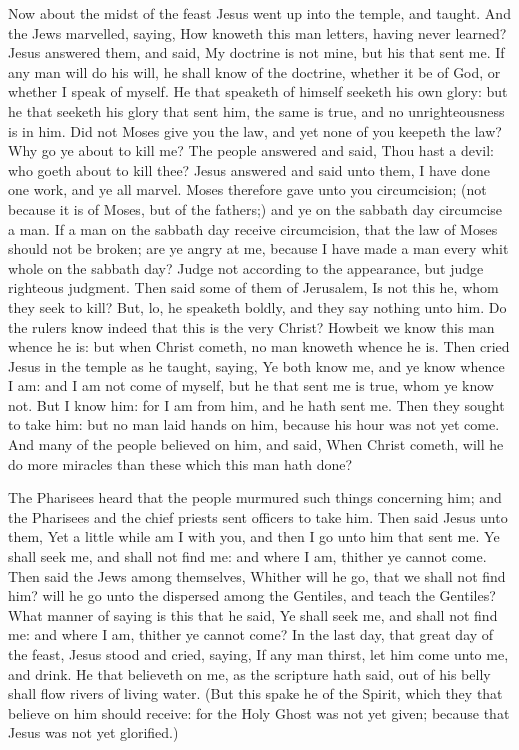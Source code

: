  Now about the midst of the feast Jesus went up into the
temple, and taught.  And the Jews marvelled, saying, How
knoweth this man letters, having never learned?  Jesus
answered them, and said, My doctrine is not mine, but his that sent me.
 If any man will do his will, he shall know of the
doctrine, whether it be of God, or whether I speak of myself.
 He that speaketh of himself seeketh his own glory: but
he that seeketh his glory that sent him, the same is true, and no
unrighteousness is in him.  Did not Moses give you the
law, and yet none of you keepeth the law? Why go ye about to kill me?
 The people answered and said, Thou hast a devil: who
goeth about to kill thee?  Jesus answered and said unto
them, I have done one work, and ye all marvel.  Moses
therefore gave unto you circumcision; (not because it is of Moses, but
of the fathers;) and ye on the sabbath day circumcise a man.
 If a man on the sabbath day receive circumcision, that
the law of Moses should not be broken; are ye angry at me, because I
have made a man every whit whole on the sabbath day? 
Judge not according to the appearance, but judge righteous judgment.
 Then said some of them of Jerusalem, Is not this he,
whom they seek to kill?  But, lo, he speaketh boldly, and
they say nothing unto him. Do the rulers know indeed that this is the
very Christ?  Howbeit we know this man whence he is: but
when Christ cometh, no man knoweth whence he is.  Then
cried Jesus in the temple as he taught, saying, Ye both know me, and ye
know whence I am: and I am not come of myself, but he that sent me is
true, whom ye know not.  But I know him: for I am from
him, and he hath sent me.  Then they sought to take him:
but no man laid hands on him, because his hour was not yet come.
 And many of the people believed on him, and said, When
Christ cometh, will he do more miracles than these which this man hath
done?

 The Pharisees heard that the people murmured such things
concerning him; and the Pharisees and the chief priests sent officers to
take him.  Then said Jesus unto them, Yet a little while
am I with you, and then I go unto him that sent me.  Ye
shall seek me, and shall not find me: and where I am, thither ye cannot
come.  Then said the Jews among themselves, Whither will
he go, that we shall not find him? will he go unto the dispersed among
the Gentiles, and teach the Gentiles?  What manner of
saying is this that he said, Ye shall seek me, and shall not find me:
and where I am, thither ye cannot come?  In the last day,
that great day of the feast, Jesus stood and cried, saying, If any man
thirst, let him come unto me, and drink.  He that
believeth on me, as the scripture hath said, out of his belly shall flow
rivers of living water.  (But this spake he of the
Spirit, which they that believe on him should receive: for the Holy
Ghost was not yet given; because that Jesus was not yet glorified.)

